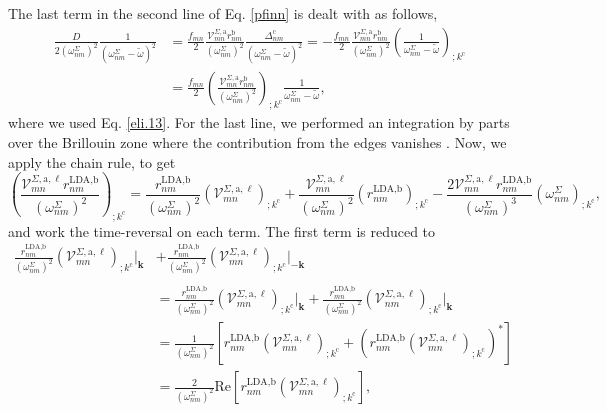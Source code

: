 The last term in the second line of Eq. \eqref{pfinn} is dealt with as follows,
\begin{align}\label{dresn}
\frac{D}{2(\omega^\Sigma_{nm})^2}\frac{1}{(\omega^\Sigma_{nm}-\tilde\omega)^2}
&= \frac{f_{mn}}{2}
   \frac{\mathcal{V}^{\Sigma,\mathrm{a}}_{mn}r^{\mathrm{b}}_{nm}}
        {(\omega^\Sigma_{nm})^2}
   \frac{\Delta^{\mathrm{c}}_{nm}}{(\omega^\Sigma_{nm}-\tilde\omega)^2} 
= -\frac{f_{mn}}{2}
   \frac{\mathcal{V}^{\Sigma,\mathrm{a}}_{mn}r^{\mathrm{b}}_{nm}}
        {(\omega^\Sigma_{nm})^2}
\left(
\frac{1}{\omega^\Sigma_{nm}-\tilde\omega}
\right)_{;k^{\mathrm{c}}}\nonumber\\
&= \frac{f_{mn}}{2}
\left(
\frac{\mathcal{V}^{\Sigma,\mathrm{a}}_{mn}r^{\mathrm{b}}_{nm}}
     {(\omega^\Sigma_{nm})^2}
\right)_{;k^{\mathrm{c}}}
\frac{1}{\omega^\Sigma_{nm}-\tilde\omega},
\end{align} 
where we used Eq. \eqref{eli.13}. For the last line, we performed an integration
by parts over the Brillouin zone where the contribution from the edges vanishes
\cite{ashcroftbook}. Now, we apply the chain rule, to get
\begin{equation}\label{chr}
    \left(\frac{\mathcal{V}^{\Sigma,\text{a},\ell}_{mn}r^{\text{LDA,b}}_{nm}}
    {(\omega^{\Sigma}_{nm})^2}\right)_{;k^{\text{c}}}
=   \frac{r^{\text{LDA,b}}_{nm}}{(\omega^{\Sigma}_{nm})^2}
    \left(\mathcal{V}^{\Sigma,\text{a},\ell}_{mn}\right)_{;k^{\text{c}}}
+   \frac{\mathcal{V}^{\Sigma,\text{a},\ell}_{mn}}{(\omega^{\Sigma}_{nm})^2}
    \left(r^{\text{LDA,b}}_{nm}\right)_{;k^{\text{c}}}
-   \frac{2\mathcal{V}^{\Sigma,\text{a},\ell}_{mn}
    r^{\text{LDA,b}}_{nm}}{(\omega^{\Sigma}_{nm})^3}
    \left(\omega^{\Sigma}_{nm}\right)_{;k^{\text{c}}},
\end{equation}
and work the time-reversal on each term. The first term is reduced to
\begin{align}\label{first_term_gen_deriv}
    \frac{r^{\text{LDA,b}}_{nm}}{(\omega^{\Sigma}_{nm})^{2}}
    \left(\mathcal{V}^{\Sigma,\text{a},\ell}_{mn}\right)
    _{;k^{\text{c}}}\vert_{\mathbf{k}}
&+  \frac{r^{\text{LDA,b}}_{nm}}{(\omega^{\Sigma}_{nm})^{2}}
    \left(\mathcal{V}^{\Sigma,\text{a},\ell}_{mn}\right)
    _{;k^{\text{c}}}\vert_{-\mathbf{k}}\nonumber\\\nonumber\\
&=  \frac{r^{\text{LDA,b}}_{nm}}{(\omega^{\Sigma}_{nm})^{2}}
    \left(\mathcal{V}^{\Sigma,\text{a},\ell}_{mn}\right)
    _{;k^{\text{c}}}\vert_{\mathbf{k}}
+   \frac{r^{\text{LDA,b}}_{mn}}{(\omega^{\Sigma}_{nm})^{2}}
    \left(\mathcal{V}^{\Sigma,\text{a},\ell}_{nm}\right)
    _{;k^{\text{c}}}\vert_{\mathbf{k}}\nonumber\\
&=  \frac{1}{(\omega^{\Sigma}_{nm})^{2}}\left[r^{\text{LDA,b}}_{nm}
    \left(\mathcal{V}^{\Sigma,\text{a},\ell}_{mn}\right)
    _{;k^{\text{c}}}
+   \left(r^{\text{LDA,b}}_{nm}
    \left(\mathcal{V}^{\Sigma,\text{a},\ell}_{mn}\right)
    _{;k^{\text{c}}}\right)^{*}\right]\nonumber\\
&=  \frac{2}{(\omega^{\Sigma}_{nm})^{2}}\mathrm{Re}\left[r^{\text{LDA,b}}_{nm}
    \left(\mathcal{V}^{\Sigma,\text{a},\ell}_{mn}\right)_{;k^{\text{c}}}\right],
\end{align}
